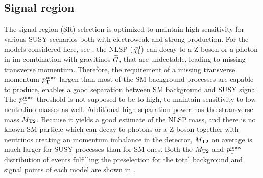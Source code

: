\subsection{Signal region}\label{sec:SRSelection}
The signal region (SR) selection is optimized to maintain high sensitivity for various SUSY scenarios both with electroweak and strong production. For the models considered here, see , the NLSP ($\widetilde{\chi}^{0}_{1}$) can decay to a Z boson or a photon in im combination with gravitinos $\widetilde{G}$, that are undectable, leading to missing transverse momentum. Therefore, the requirement of a missing transverse momentum $p_{\mathrm{T}}^\text{miss}$ largen than most of the SM background processes are capable to produce, enables a good separation between SM background and SUSY signal. The $p_{\mathrm{T}}^\text{miss}$ threshold is not supposed to be to high, to maintain sensitivity to low neutralino masses as well.
Additional high separation power has the stransverse mass $M_{\mathrm{T2}}$. Because it yields a good estimate of the NLSP mass, and there is no known SM particle which can decay to photons or a Z boson together with neutrinos creating an momentum imbalance in the detector, $M_{\mathrm{T2}}$ on average is much larger for SUSY processes than for SM ones. Both the $M_{\mathrm{T2}}$ and $p_{\mathrm{T}}^\text{miss}$ distribution of events fulfilling the preselection for the total background and signal points of each model are shown in .
